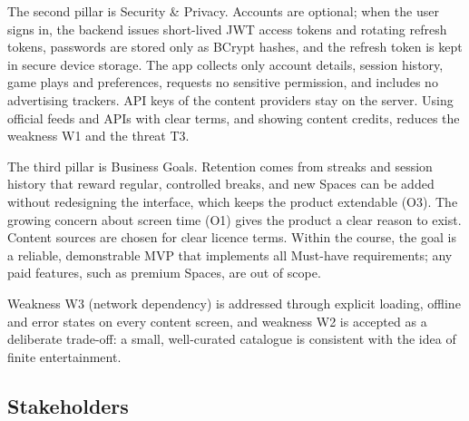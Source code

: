 The second pillar is Security \& Privacy. Accounts are optional; when the
user signs in, the backend issues short-lived JWT access tokens and rotating
refresh tokens, passwords are stored only as BCrypt hashes, and the refresh
token is kept in secure device storage. The app collects only account
details, session history, game plays and preferences, requests no sensitive
permission, and includes no advertising trackers. API keys of the content
providers stay on the server. Using official feeds and APIs with clear terms,
and showing content credits, reduces the weakness W1 and the threat T3.

The third pillar is Business Goals. Retention comes from streaks and session
history that reward regular, controlled breaks, and new Spaces can be added
without redesigning the interface, which keeps the product extendable (O3).
The growing concern about screen time (O1) gives the product a clear reason
to exist. Content sources are chosen for clear licence terms. Within the
course, the goal is a reliable, demonstrable MVP that implements all
Must-have requirements; any paid features, such as premium Spaces, are out of
scope.

Weakness W3 (network dependency) is addressed through explicit loading,
offline and error states on every content screen, and weakness W2 is accepted
as a deliberate trade-off: a small, well-curated catalogue is consistent with
the idea of finite entertainment.

\subsection{Stakeholders}
\label{sec:stakeholders}

